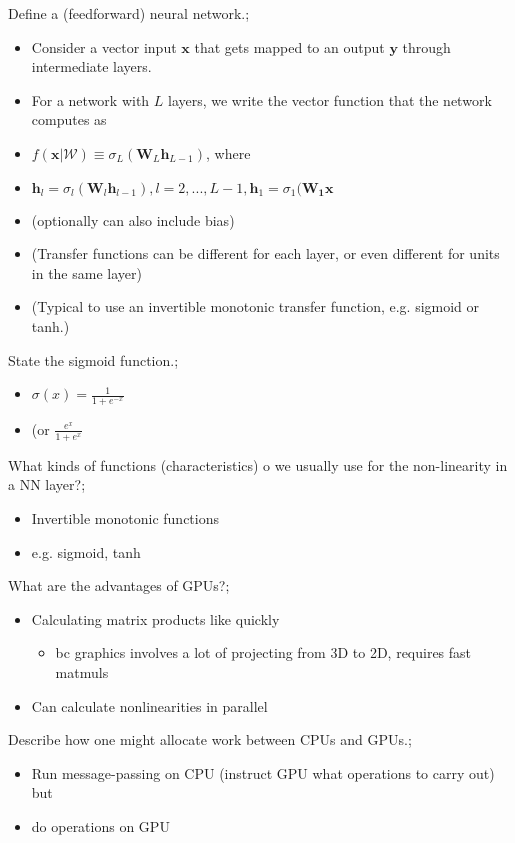 \documentclass{article}
\begin{document}
Define a (feedforward) neural network.; \begin{itemize} \item Consider a vector input $\bm{x}$ that gets mapped to an output $\bm{y}$ through intermediate layers. \item For a network with $L$ layers, we write the vector function that the network computes as  \item $f(\bm{x}|\mathcal{W})\equiv \sigma_L(\bm{W}_L\bm{h}_{L-1})$, where \item $\bm{h}_l = \sigma_l(\bm{W}_l\bm{h}_{l-1}), l=2,...,L-1, \bm{h}_1 = \sigma_1(\bm{W_1x}$ \item (optionally can also include bias) \item (Transfer functions can be different for each layer, or even different for units in the same layer) \item (Typical to use an invertible monotonic transfer function, e.g. sigmoid or tanh.) \end{itemize}

State the sigmoid function.; \begin{itemize} \item $\sigma(x) = \frac{1}{1 + e^{-x}}$ \item (or $\frac{e^x}{1+e^x}$ \end{itemize}

What kinds of functions (characteristics) o we usually use for the non-linearity in a NN layer?; \begin{itemize} \item Invertible monotonic functions \item e.g. sigmoid, tanh \end{itemize}

What are the advantages of GPUs?; \begin{itemize} \item Calculating matrix products like  quickly \begin{itemize} \item bc graphics involves a lot of projecting from 3D to 2D, requires fast matmuls \end{itemize} \item Can calculate nonlinearities in parallel \end{itemize}

Describe how one might allocate work between CPUs and GPUs.; \begin{itemize} \item Run message-passing on CPU (instruct GPU what operations to carry out) but \item do operations on GPU \end{itemize}
\end{document}
